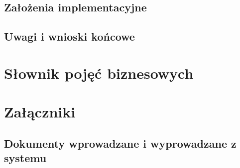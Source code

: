 \documentclass[paper=a4, fontsize=12pt]{scrartcl}
\numberwithin{equation}{section}		%
\numberwithin{figure}{section}			%
\numberwithin{table}{section}				%
\begin{document}
	\subsection{Założenia implementacyjne}
		

	\subsection{Uwagi i wnioski końcowe}
		


\section{Słownik pojęć biznesowych}
	

\section{Załączniki}
	\subsection{Dokumenty wprowadzane i wyprowadzane z systemu}
			
		
		
				
				
\end{document}
